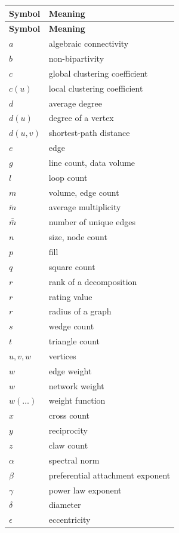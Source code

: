 \documentclass{article}
\begin{document}
\begin{longtable}{ll}
  \toprule
  \textbf{Symbol} & \textbf{Meaning} \\
  \midrule
  \endfirsthead
  \toprule
  \textbf{Symbol} & \textbf{Meaning} \\
  \midrule
  \endhead
  \bottomrule
  \endfoot
  \bottomrule
  \endlastfoot
  $a$ & algebraic connectivity \\
  $b$ & non-bipartivity \\
  $c$ & global clustering coefficient \\
  $c(u)$ & local clustering coefficient \\
  $d$ & average degree \\
  $d(u)$ & degree of a vertex \\
  $d(u,v)$ & shortest-path distance \\
  $e$ & edge \\
  $g$ & line count, data volume \\
  $l$ & loop count \\
  $m$ & volume, edge count \\
  $\tilde{m}$ & average multiplicity \\
  $\bar{\bar m}$ & number of unique edges \\
  $n$ & size, node count \\
  $p$ & fill \\
  $q$ & square count \\
  $r$ & rank of a decomposition \\
  $r$ & rating value \\
  $r$ & radius of a graph \\
  $s$ & wedge count \\
  $t$ & triangle count \\
  $u, v, w$ & vertices \\
  $w$ & edge weight \\ 
  $w$ & network weight \\
  $w(\ldots)$ & weight function \\
  $x$ & cross count \\
  $y$ & reciprocity \\
  $z$ & claw count \\
  \midrule
  $\alpha$ & spectral norm \\
  $\beta$  & preferential attachment exponent \\
  $\gamma$ & power law exponent \\
  $\delta$ & diameter \\
  $\epsilon$ & eccentricity \\

\end{longtable}
\end{document}
